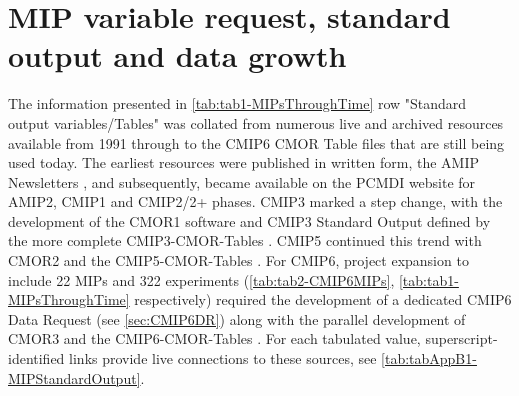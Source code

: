 \documentclass[manuscript]{copernicus}
\begin{document}
\section{MIP variable request, standard output and data growth}  %
\label{sec:secAppB1-MIPStandardOutput}
The information presented in \autoref{tab:tab1-MIPsThroughTime} row "Standard output variables/Tables" was collated from numerous live and archived resources available from 1991 through to the CMIP6 CMOR Table files that are still being used today. The earliest resources were published in written form, the AMIP Newsletters \citep[e.g.,][]{gates_amip_1991}, and subsequently, became available on the PCMDI website for AMIP2, CMIP1 and CMIP2/2+ phases. CMIP3 marked a step change, with the development of the CMOR1 software \citep{taylor_cmor_2006} and CMIP3 Standard Output defined by the more complete CMIP3-CMOR-Tables \citep{doutriaux_cmip3_2005}. CMIP5 continued this trend with CMOR2 \citep{doutriaux_cmor_2011} and the CMIP5-CMOR-Tables \citep{doutriaux_cmip5_2013}. For CMIP6, project expansion to include 22 MIPs and 322 experiments (\autoref{tab:tab2-CMIP6MIPs}, \autoref{tab:tab1-MIPsThroughTime} respectively) required the development of a dedicated CMIP6 Data Request (see \autoref{sec:CMIP6DR}) along with the parallel development of CMOR3 \citep{mauzey_cmor_2024} and the CMIP6-CMOR-Tables \citep{nadeau_cmip6_2017}. For each tabulated value, superscript-identified links provide live connections to these sources, see \autoref{tab:tabAppB1-MIPStandardOutput}.
\end{document}
